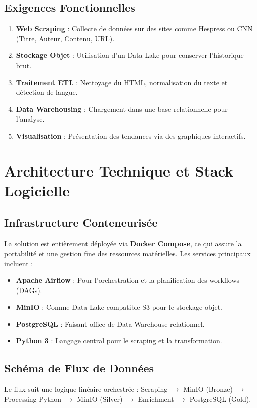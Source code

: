 \documentclass[12pt,a4paper]{article}
\begin{document}
\subsection{Exigences Fonctionnelles}
\begin{enumerate}
    \item \textbf{Web Scraping} : Collecte de données sur des sites comme Hespress ou CNN (Titre, Auteur, Contenu, URL).
    \item \textbf{Stockage Objet} : Utilisation d'un Data Lake pour conserver l'historique brut.
    \item \textbf{Traitement ETL} : Nettoyage du HTML, normalisation du texte et détection de langue.
    \item \textbf{Data Warehousing} : Chargement dans une base relationnelle pour l'analyse.
    \item \textbf{Visualisation} : Présentation des tendances via des graphiques interactifs.
\end{enumerate}

\section{Architecture Technique et Stack Logicielle}
\subsection{Infrastructure Conteneurisée}
La solution est entièrement déployée via \textbf{Docker Compose}, ce qui assure la portabilité et une gestion fine des ressources matérielles. Les services principaux incluent :
\begin{itemize}
    \item \textbf{Apache Airflow} : Pour l'orchestration et la planification des workflows (DAGs).
    \item \textbf{MinIO} : Comme Data Lake compatible S3 pour le stockage objet.
    \item \textbf{PostgreSQL} : Faisant office de Data Warehouse relationnel.
    \item \textbf{Python 3} : Langage central pour le scraping et la transformation.
\end{itemize}

\subsection{Schéma de Flux de Données}
Le flux suit une logique linéaire orchestrée :
Scraping $\rightarrow$ MinIO (Bronze) $\rightarrow$ Processing Python $\rightarrow$ MinIO (Silver) $\rightarrow$ Enrichment $\rightarrow$ PostgreSQL (Gold).
\end{document}
